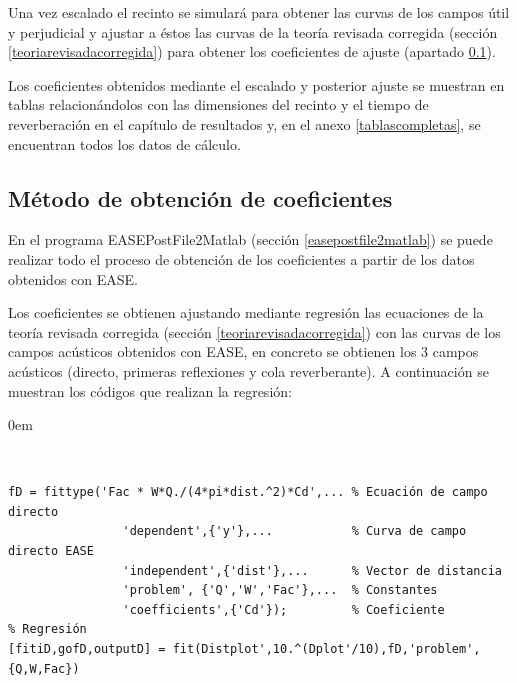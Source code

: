 Una vez escalado el recinto se simulará para obtener las curvas de los campos útil y perjudicial y ajustar a éstos las curvas de la teoría revisada corregida (sección \ref{teoriarevisadacorregida}) para obtener los coeficientes de ajuste (apartado \ref{metodocoeficientes}).

Los coeficientes obtenidos mediante el escalado y posterior ajuste se muestran en tablas relacionándolos con las dimensiones del recinto y el tiempo de reverberación en el capítulo de resultados y, en el anexo \ref{tablascompletas}, se encuentran todos los datos de cálculo.


\subsection{Método de obtención de coeficientes}
\label{metodocoeficientes}
En el programa EASEPostFile2Matlab (sección \ref{easepostfile2matlab}) se puede realizar todo el proceso de obtención de los coeficientes a partir de los datos obtenidos con EASE.

Los coeficientes se obtienen ajustando mediante regresión las ecuaciones de la teoría revisada corregida (sección \ref{teoriarevisadacorregida}) con las curvas de los campos acústicos obtenidos con EASE, en concreto se obtienen los 3 campos acústicos (directo, primeras reflexiones y cola reverberante). A continuación se muestran los códigos que realizan la regresión:

\begin{description}
\itemsep0em
  \item[Campo directo:]~
\vspace{-0.3cm}
\end{description}
\begin{lstlisting}[style=Matlab-color,numbers=none, caption={Líneas de código Matlab para obtener coeficientes de la teoría revisada corregida del campo directo.},label=coefdirect]
% Parámetros de la regresión
fD = fittype('Fac * W*Q./(4*pi*dist.^2)*Cd',... % Ecuación de campo directo
                'dependent',{'y'},...			% Curva de campo directo EASE
                'independent',{'dist'},...		% Vector de distancia
                'problem', {'Q','W','Fac'},...	% Constantes
                'coefficients',{'Cd'});			% Coeficiente
% Regresión
[fitiD,gofD,outputD] = fit(Distplot',10.^(Dplot'/10),fD,'problem',{Q,W,Fac})
\end{lstlisting}

